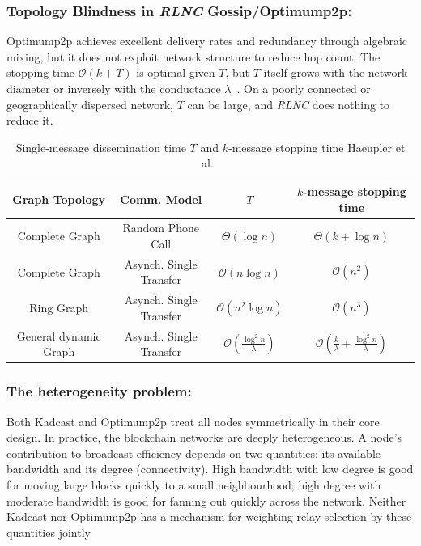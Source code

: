 \documentclass{article}
\begin{document}
\subsubsection*{Topology Blindness in \textit{RLNC} Gossip/Optimump2p:} Optimump2p achieves excellent delivery rates and redundancy through algebraic mixing, but it does not exploit network structure to reduce hop count. The stopping time $\mathcal{O}{(k + T)}$ is optimal given $T$, but $T$ itself grows with the network diameter or inversely with the conductance $\lambda$~\cite{haeuplerAnalyzingNetworkCoding2010}. On a poorly connected or geographically dispersed network, $T$ can be large, and \textit{RLNC} does nothing to reduce it. 

\begin{table}[htbp]
	\centering
  \caption{Single-message dissemination time $T$ and $k$-message stopping time Haeupler et al.~\cite{haeuplerAnalyzingNetworkCoding2010}}
	\label{tab:time}
	\begin{tabular}{cccc}
		\toprule
		Graph Topology &  Comm. Model & $T$ & $k$-message stopping time \\
		\midrule
		Complete Graph & Random Phone Call & $\Theta(\log n)$ & $\Theta(k + \log n)$ \\
		Complete Graph & Asynch. Single Transfer & $\mathcal{O}{(n\log n)}$ & $\mathcal{O}{(n^2)}$ \\
		Ring Graph & Asynch. Single Transfer & $\mathcal{O}{(n^2\log n)}$ & $\mathcal{O}{(n^3)}$ \\
		General dynamic Graph & Asynch. Single Transfer & $\mathcal{O}{\left(\frac{\log^2 n}{\lambda}\right)}$ & $\mathcal{O}{\left(\frac{k}{\lambda} + \frac{\log^2 n}{\lambda}\right)}$ \\
		\bottomrule
	\end{tabular}
\end{table}

\subsubsection*{The heterogeneity problem:} Both Kadcast and Optimump2p treat all nodes symmetrically in their core design. In practice, the blockchain networks are deeply heterogeneous. A node's contribution to broadcast efficiency depends on two quantities: its available bandwidth and its degree (connectivity). High bandwidth with low degree is good for moving large blocks quickly to a small neighbourhood; high degree with moderate bandwidth is good for fanning out quickly across the network. Neither Kadcast nor Optimump2p has a mechanism for weighting relay selection by these quantities jointly
\end{document}
